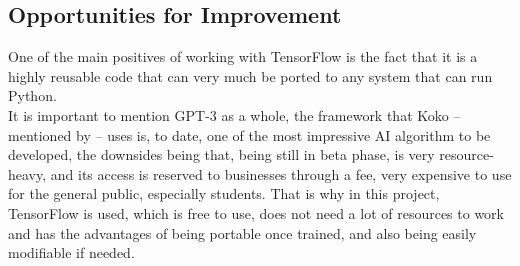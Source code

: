 \subsection{Opportunities for Improvement}
One of the main positives of working with TensorFlow is the fact that it is a highly reusable code that can very much be ported to any system that can run Python.\\
It is important to mention GPT-3 as a whole, the framework that Koko -- mentioned by \citet{rf6} -- uses is, to date, one of the most impressive AI algorithm to be developed, the downsides being that, being still in beta phase, is very resource-heavy, and its access is reserved to businesses through a fee, very expensive to use for the general public, especially students. That is why in this project, TensorFlow is used, which is free to use, does not need a lot of resources to work and has the advantages of being portable once trained, and also being easily modifiable if needed.
